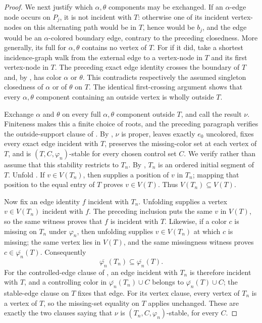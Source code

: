 \begin{proof}
We next justify which $\alpha,\theta$ components may be exchanged.  If an
$\alpha$-edge node occurs on $P_j$, it is not incident with $T$:
otherwise one of its incident vertex-nodes on this alternating path
would be in $T$, hence would be $b_j$, and the edge would be an
$\alpha$-colored boundary edge, contrary to the preceding closedness.
More generally, its full  for
$\alpha,\theta$ contains no vertex of $T$.  For if it did, take a
shortest incidence-graph walk from the external edge to a vertex-node in
$T$ and its first vertex-node in $T$.  The preceding exact edge identity
crosses the boundary of $T$ and, by
, has color $\alpha$ or $\theta$.
This contradicts respectively the assumed singleton closedness of
$\alpha$ or of $\theta$ on $T$.  The identical first-crossing argument
shows that every $\alpha,\theta$ component containing an outside vertex
is wholly outside $T$.

Exchange $\alpha$ and $\theta$ on every full $\alpha,\theta$ component
outside $T$, and call the result $\nu$.  Finiteness makes this a finite
choice of roots, and the preceding paragraph verifies the outside-support
clause of .  By
, $\nu$ is proper, leaves exactly
$e_0$ uncolored, fixes every exact edge incident with $T$, preserves the
missing-color set at each vertex of $T$, and is
$(T,C,\varphi_n)$-stable for every chosen control set $C$.  We verify
rather than assume that this stability restricts to $T_n$.  By
, $T_n$ is an ordered initial segment of
$T$.  Unfold .  If
$v\in V(T_n)$, then  supplies a position
of $v$ in $T_n$; mapping that position to the equal entry of $T$ proves
$v\in V(T)$.  Thus $V(T_n)\subseteq V(T)$.

Now fix an edge identity $f$ incident with $T_n$.  Unfolding
 supplies a vertex $v\in V(T_n)$ incident with
$f$.  The preceding inclusion puts the same $v$ in $V(T)$, so the same
witness proves that $f$ is incident with $T$.  Likewise, if a color $c$
is missing on $T_n$ under $\varphi_n$, then unfolding
 supplies $v\in V(T_n)$ at which $c$ is
missing; the same vertex lies in $V(T)$, and the same missingness witness
proves $c\in\overline{\varphi_n}(T)$.  Consequently
\[
 \overline{\varphi_n}(T_n)\subseteq
 \overline{\varphi_n}(T).
\]
For the controlled-edge clause of , an edge
incident with $T_n$ is therefore incident with $T$, and a controlling
color in $\overline{\varphi_n}(T_n)\cup C$ belongs to
$\overline{\varphi_n}(T)\cup C$; the stable-edge clause on $T$ fixes that
edge.  For its vertex clause, every vertex of $T_n$ is a vertex of $T$,
so the missing-set equality on $T$ applies unchanged.  These are exactly
the two clauses saying that $\nu$ is
$(T_n,C,\varphi_n)$-stable, for every $C$.


\end{proof}
